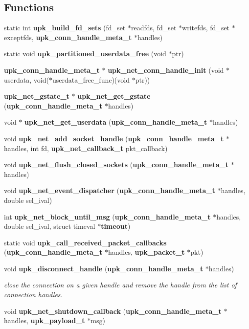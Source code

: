 \subsection*{Functions}
\begin{DoxyCompactItemize}
\item 
static int {\bf upk\_\-build\_\-fd\_\-sets} (fd\_\-set $\ast$readfds, fd\_\-set $\ast$writefds, fd\_\-set $\ast$exceptfds, {\bf upk\_\-conn\_\-handle\_\-meta\_\-t} $\ast$handles)
\item 
static void {\bf upk\_\-partitioned\_\-userdata\_\-free} (void $\ast$ptr)
\item 
{\bf upk\_\-conn\_\-handle\_\-meta\_\-t} $\ast$ {\bf upk\_\-net\_\-conn\_\-handle\_\-init} (void $\ast$userdata, void($\ast$userdata\_\-free\_\-func)(void $\ast$ptr))
\item 
{\bf upk\_\-net\_\-gstate\_\-t} $\ast$ {\bf upk\_\-net\_\-get\_\-gstate} ({\bf upk\_\-conn\_\-handle\_\-meta\_\-t} $\ast$handles)
\item 
void $\ast$ {\bf upk\_\-net\_\-get\_\-userdata} ({\bf upk\_\-conn\_\-handle\_\-meta\_\-t} $\ast$handles)
\item 
void {\bf upk\_\-net\_\-add\_\-socket\_\-handle} ({\bf upk\_\-conn\_\-handle\_\-meta\_\-t} $\ast$handles, int fd, {\bf upk\_\-net\_\-callback\_\-t} pkt\_\-callback)
\item 
void {\bf upk\_\-net\_\-flush\_\-closed\_\-sockets} ({\bf upk\_\-conn\_\-handle\_\-meta\_\-t} $\ast$handles)
\item 
void {\bf upk\_\-net\_\-event\_\-dispatcher} ({\bf upk\_\-conn\_\-handle\_\-meta\_\-t} $\ast$handles, double sel\_\-ival)
\item 
int {\bf upk\_\-net\_\-block\_\-until\_\-msg} ({\bf upk\_\-conn\_\-handle\_\-meta\_\-t} $\ast$handles, double sel\_\-ival, struct timeval $\ast${\bf timeout})
\item 
static void {\bf upk\_\-call\_\-received\_\-packet\_\-callbacks} ({\bf upk\_\-conn\_\-handle\_\-meta\_\-t} $\ast$handles, {\bf upk\_\-packet\_\-t} $\ast$pkt)
\item 
void {\bf upk\_\-disconnect\_\-handle} ({\bf upk\_\-conn\_\-handle\_\-meta\_\-t} $\ast$handles)
\begin{DoxyCompactList}\small\item\em close the connection on a given handle and remove the handle from the list of connection handles. \end{DoxyCompactList}\item 
void {\bf upk\_\-net\_\-shutdown\_\-callback} ({\bf upk\_\-conn\_\-handle\_\-meta\_\-t} $\ast$handles, {\bf upk\_\-payload\_\-t} $\ast$msg)

\end{DoxyCompactItemize}

